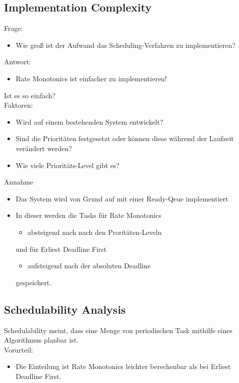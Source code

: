 \subsection{Implementation Complexity}
\begin{frame}{\subsecname}
	Frage:
	\begin{itemize}
		\item Wie groß ist der Aufwand das Scheduling-Verfahren zu implementieren?
	\end{itemize}
	Antwort:
	\begin{itemize}
		\item Rate Monotonics ist einfacher zu implementieren!
	\end{itemize}
\end{frame}

\begin{frame}{\subsecname}
	Ist es so einfach?\\\pause
	Faktoren:
	\begin{itemize}
		\item Wird auf einem bestehenden System entwickelt?
		\item Sind die Prioritäten festgesetzt oder können diese während der Laufzeit verändert werden?
		\item Wie viele Prioritäts-Level gibt es? %
	\end{itemize}
\end{frame}

\begin{frame}{\subsecname}
	Annahme
	\begin{itemize}
		\item Das System wird von Grund auf mit einer Ready-Qeue implementiert\pause
		\item In dieser werden die Tasks für Rate Monotonics
			\begin{itemize}
				\item absteigend nach nach den Proritäten-Leveln
			\end{itemize}
			und für Erliest Deadline First
			\begin{itemize}
				\item aufsteigend nach der absoluten Deadline
			\end{itemize} gespeichert.
	\end{itemize}
\end{frame}



\subsection{Schedulability Analysis}
\begin{frame}{\subsecname}
	Schedulability meint, dass eine Menge von periodischen Task mithilfe eines Algorithmus planbar ist.\\
	
	Vorurteil:
	\begin{itemize}
		\item Die Einteilung ist Rate Monotonics leichter berechenbar als bei Erliest Deadline First.
	\end{itemize}
\end{frame}

